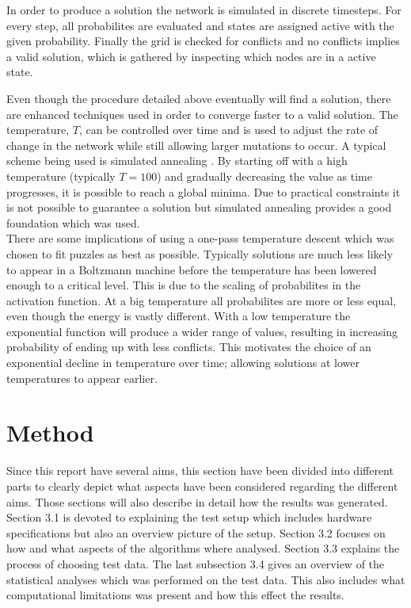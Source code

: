 \documentclass[a4paper,11pt]{kth-mag}
\begin{document}
In order to produce a solution the network is simulated in discrete timesteps.
For every step, all probabilites are evaluated and states are assigned active with the given probability.
Finally the grid is checked for conflicts and no conflicts implies a valid solution, which is gathered by inspecting which nodes are in a active state.

Even though the procedure detailed above eventually will find a solution, there are enhanced techniques used in order to converge faster to a valid solution.
The temperature, $T$, can be controlled over time and is used to adjust the rate of change in the network while still allowing larger mutations to occur.
A typical scheme being used is simulated annealing \cite{simulatedAnnealing}.
By starting off with a high temperature (typically $T = 100$) and gradually decreasing the value as time progresses, it is possible to reach a global minima.
Due to practical constraints it is not possible to guarantee a solution but simulated annealing provides a good foundation which was used.\\

There are some implications of using a one-pass temperature descent which was chosen to fit puzzles as best as possible.
Typically solutions are much less likely to appear in a Boltzmann machine before the temperature has been lowered enough to a critical level.
This is due to the scaling of probabilites in the activation function.
At a big temperature all probabilites are more or less equal, even though the energy is vastly different.
With a low temperature the exponential function will produce a wider range of values, resulting in increasing probability of ending up with less conflicts.
This motivates the choice of an exponential decline in temperature over time; allowing solutions at lower temperatures to appear earlier.

\chapter{Method}
Since this report have several aims, this section have been divided into different parts to clearly depict what aspects have been considered regarding the different aims. 
Those sections will also describe in detail how the results was generated. 
Section 3.1 is devoted to explaining the test setup which includes hardware specifications but also an overview picture of the setup. 
Section 3.2 focuses on how and what aspects of the algorithms where analysed.
Section 3.3 explains the process of choosing test data.
The last subsection 3.4 gives an overview of the statistical analyses which was performed on the test data.
This also includes what computational limitations was present and how this effect the results. 
\end{document}
